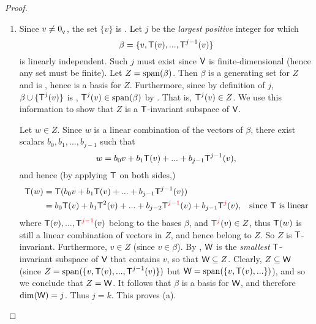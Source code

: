 \begin{proof} \ 

\begin{enumerate}
\item Since \(v \ne 0_{_{\textsf{V}}}\), the set \(\{ v \}\) is \LID{}.
Let \(j\) be the \emph{largest positive} integer for which
\[
    \beta = \{ v, \textsf{T}(v), ..., \textsf{T}^{j - 1}(v) \}
\]
is linearly independent.
Such \(j\) must exist since \(\textsf{V}\) is finite-dimensional (hence any \LID{} set must be finite).
Let \(Z = \operatorname{span}(\beta)\).
Then \(\beta\) is a generating set for \(Z\) and is \LID{}, hence is a basis for \(Z\).
Furthermore, since by definition of \(j\), \(\beta \cup \{ \textsf{T}^j(v) \}\) is \LDP{}, \(\textsf{T}^j(v) \in \operatorname{span}(\beta)\) by .
That is, \(\textsf{T}^j(v) \in Z\).
We use this information to show that \(Z\) is a \(\textsf{T}\)-invariant subspace of \(\textsf{V}\).

Let \(w \in Z\).
Since \(w\) is a linear combination of the vectors of \(\beta\), there exist scalars \(b_0, b_1, ..., b_{j - 1}\) such that
\[
    w = b_0 v + b_1 \textsf{T}(v) + ... + b_{j - 1} \textsf{T}^{j - 1}(v),
\]
and hence (by applying \(\textsf{T}\) on both sides,)
\begin{align*}
    \T(w) & = \T(b_0 v + b_1 \T(v) + ... + b_{j - 1} \T^{j - 1}(v)) \\
          & = b_0 \T(v) + b_1 \T^2(v) + ... + b_{j - 2} \T^{\RED{j - 1}}(v) + b_{j - 1} \T^{\RED{j}}(v), & \text{since \(\T\) is linear}
\end{align*}
where \(\T(v), ..., \T^{\RED{j - 1}}(v)\) belong to the bases \(\beta\), and \(\T^{\RED{j}}(v) \in Z\), thus \(\textsf{T}(w)\) is still a linear combination of vectors in \(Z\), and hence belong to \(Z\).
So \(Z\) is \(\textsf{T}\)-invariant.
Furthermore, \(v \in Z\) (since \(v \in \beta\)).
By , \(\textsf{W}\) is the \emph{smallest} \(\textsf{T}\)-invariant subspace of \(\textsf{V}\) that contains \(v\), so that \(\textsf{W} \subseteq Z\).
Clearly, \(Z \subseteq \textsf{W}\) (since \(Z = \operatorname{span}(\{ v, \textsf{T}(v), ..., \textsf{T}^{j - 1}(v) \})\) but \(\textsf{W} = \operatorname{span}(\{ v, \textsf{T}(v), ... \})\)), and so we conclude that \(Z = \textsf{W}\).
It follows that \(\beta\) is a basis for \(\textsf{W}\), and therefore \(\dim(\textsf{W}) = j\).
Thus \(j = k\).
This proves (a).


\end{enumerate}
\end{proof}
